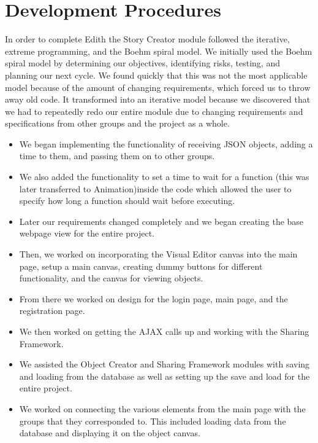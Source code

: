 \documentclass[12pt]{article}
\begin{document}
\section{Development Procedures}
In order to complete Edith the Story Creator module followed the iterative, extreme programming, and the Boehm spiral model.  We initially used the Boehm spiral model by determining our objectives, identifying risks, testing, and planning our next cycle.  We found quickly that this was not the most applicable model because of the amount of changing requirements, which forced us to throw away old code.  It transformed into an iterative model because we discovered that we had to repeatedly redo our entire module due to changing requirements and specifications from other groups and the project as a whole.  
\begin{itemize}


\item We began implementing the functionality of receiving JSON objects, adding a time to them, and passing them on to other groups. 

\item We also added the functionality to set a time to wait for a function (this was later transferred to Animation)inside the code which allowed the user to specify how long a function should wait before executing. 

\item Later our requirements changed completely and we began creating the base webpage view for the entire project. 

\item Then, we worked on incorporating the Visual Editor canvas into the main page, setup a main canvas, creating dummy buttons for different functionality, and the canvas for viewing objects. 

\item From there we worked on design for the login page, main page, and the registration page. 

\item We then worked on getting the AJAX calls up and working with the Sharing Framework.   

\item We assisted the Object Creator and Sharing Framework modules with saving and loading from the database as well as setting up the save and load for the entire project. 

\item We worked on connecting the various elements from the main page with the groups that they corresponded to.  This included loading data from the database and displaying it on the object canvas.  \\

\end{itemize}
\end{document}
